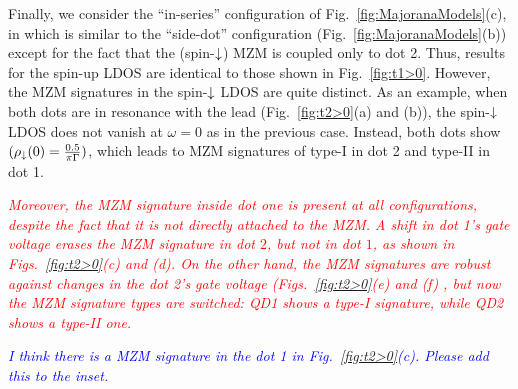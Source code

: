 \documentclass[showpacs,aps,prb,reprint,superscriptaddress]{revtex4-2}
\newcommand{\LUIS}[1]{\textcolor{blue}{\fbox{Luis} {\sl#1}}}
\newcommand{\change}[1]{\textcolor{red}{\sl#1}}
\begin{document}
    Finally, we consider the ``in-series'' configuration of  Fig.\ \ref{fig:MajoranaModels}(c), in which is similar to the ``side-dot''  configuration (Fig.\ \ref{fig:MajoranaModels}(b)) except for the fact that the (spin-$\downarrow$) MZM is coupled only to dot 2. Thus, results for the spin-up LDOS are identical to those shown in Fig.\ \ref{fig:t1>0}. However, the MZM signatures in the spin-$\downarrow$ LDOS are quite distinct. As an example, when both dots are in resonance with the lead (Fig.\ \ref{fig:t2>0}(a) and (b)), the spin-$\downarrow$ LDOS does not vanish at $\omega\!=\!0$ as in the previous case. Instead, both dots show $(\rho_\downarrow(0)=\frac{0.5}{\pi \Gamma})$, which leads to MZM signatures of type-I in dot 2 and type-II in dot 1.
    

\change{Moreover, the MZM signature inside dot one is present at all configurations, despite the fact that it is not directly attached to the MZM. A shift in dot 1's gate voltage erases \change{the MZM signature in dot $2$, but not in dot $1$,} as shown in Figs.\ \ref{fig:t2>0}(c) and (d). On the other hand, the MZM signatures are robust against changes in the dot 2's gate voltage (Figs.\ \ref{fig:t2>0}(e) and (f) , but now the MZM signature types are switched: QD1 shows a type-I signature, while QD2 shows a type-II one.}  


\LUIS{I think there is a MZM signature in the dot 1 in Fig.\ \ref{fig:t2>0}(c). Please add this to the inset.}  

\end{document}
